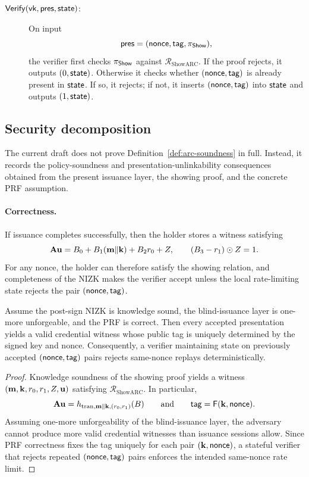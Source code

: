 \begin{description}
\item[$\mathsf{Verify}(\mathsf{vk},\mathsf{pres},\mathsf{state})$:] On input
\[
  \mathsf{pres}=(\mathsf{nonce},\mathsf{tag},\pi_{\mathsf{Show}}),
\]
the verifier first checks $\pi_{\mathsf{Show}}$ against $\mathcal R_{\mathrm{ShowARC}}$.  If the proof rejects, it outputs
$(0,\mathsf{state})$.  Otherwise it checks whether $(\mathsf{nonce},\mathsf{tag})$ is already present in $\mathsf{state}$.  If so, it
rejects; if not, it inserts $(\mathsf{nonce},\mathsf{tag})$ into $\mathsf{state}$ and outputs $(1,\mathsf{state})$.
\end{description}

\subsection{Security decomposition}
The current draft does not prove Definition~\ref{def:arc-soundness} in full.  Instead, it records the policy-soundness
and presentation-unlinkability consequences obtained from the present issuance layer, the showing proof, and the
concrete PRF assumption.

\paragraph{Correctness.}
If issuance completes successfully, then the holder stores a witness satisfying
\[
  \mathbf{A}\mathbf{u}=B_0+B_1(\mathbf{m}\Vert\mathbf{k})+B_2r_0+Z,
  \qquad
  (B_3-r_1)\odot Z=1.
\]
For any nonce, the holder can therefore satisfy the showing relation, and completeness of the NIZK makes the
verifier accept unless the local rate-limiting state rejects the pair $(\mathsf{nonce},\mathsf{tag})$.

\begin{proposition}\label{prop:arc-policy-soundness}
Assume the post-sign NIZK is knowledge sound, the blind-issuance layer is one-more unforgeable, and the
PRF is correct.  Then every accepted presentation yields a valid credential witness whose public tag is uniquely
determined by the signed key and nonce.  Consequently, a verifier maintaining state on previously accepted
$(\mathsf{nonce},\mathsf{tag})$ pairs rejects same-nonce replays deterministically.
\end{proposition}

\begin{proof}
Knowledge soundness of the showing proof yields a witness
$(\mathbf{m},\mathbf{k},r_0,r_1,Z,\mathbf{u})$ satisfying $\mathcal R_{\mathrm{ShowARC}}$.  In particular,
\[
  \mathbf{A}\mathbf{u}=h_{\mathrm{tran},\mathbf{m}\Vert\mathbf{k},(r_0,r_1)}(B)
  \qquad\text{and}\qquad
  \mathsf{tag}=\mathsf{F}(\mathbf{k},\mathsf{nonce}).
\]
Assuming one-more unforgeability of the blind-issuance layer, the adversary cannot produce more valid
credential witnesses than issuance sessions allow.  Since PRF correctness fixes the tag uniquely for each pair
$(\mathbf{k},\mathsf{nonce})$, a stateful verifier that rejects repeated $(\mathsf{nonce},\mathsf{tag})$ pairs enforces the intended
same-nonce rate limit.
\end{proof}

